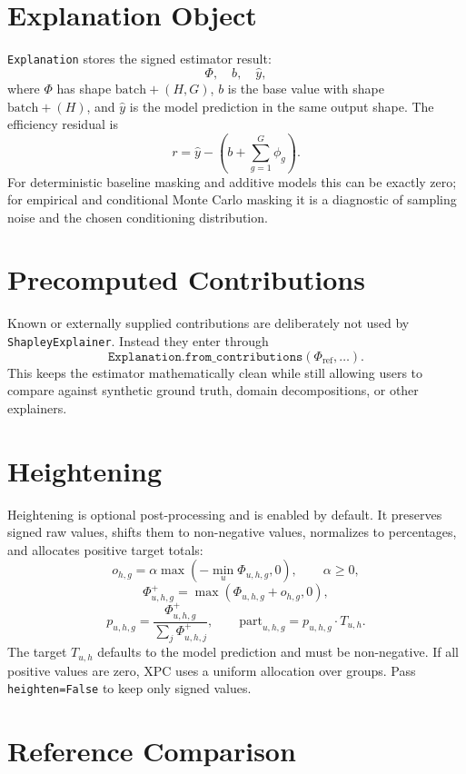 \documentclass[11pt]{article}
\newcommand{\code}[1]{\texttt{#1}}
\begin{document}
\section{Explanation Object}

\code{Explanation} stores the signed estimator result:
\[
\Phi,\quad b,\quad \hat{y},
\]
where \(\Phi\) has shape \(\mathrm{batch}+ (H,G)\), \(b\) is the base value
with shape \(\mathrm{batch}+(H)\), and \(\hat{y}\) is the model prediction in
the same output shape.  The efficiency residual is
\[
r = \hat{y} - \left(b + \sum_{g=1}^{G} \phi_g\right).
\]
For deterministic baseline masking and additive models this can be exactly
zero; for empirical and conditional Monte Carlo masking it is a diagnostic of
sampling noise and the chosen conditioning distribution.

\section{Precomputed Contributions}

Known or externally supplied contributions are deliberately not used by
\code{ShapleyExplainer}.  Instead they enter through
\[
\code{Explanation.from\_contributions}(\Phi_{\mathrm{ref}}, \dots).
\]
This keeps the estimator mathematically clean while still allowing users to
compare against synthetic ground truth, domain decompositions, or other
explainers.

\section{Heightening}

Heightening is optional post-processing and is enabled by default.  It preserves
signed raw values, shifts them to non-negative values, normalizes to
percentages, and allocates positive target totals:
\[
o_{h,g}
=
\alpha \max\!\left(-\min_u \Phi_{u,h,g}, 0\right),
\qquad \alpha \ge 0,
\]
\[
\Phi^{+}_{u,h,g}
=
\max\!\left(\Phi_{u,h,g} + o_{h,g}, 0\right),
\]
\[
p_{u,h,g}
=
\frac{\Phi^{+}_{u,h,g}}{\sum_j \Phi^{+}_{u,h,j}},
\qquad
\mathrm{part}_{u,h,g}
=
p_{u,h,g} \cdot T_{u,h}.
\]
The target \(T_{u,h}\) defaults to the model prediction and must be
non-negative.  If all positive values are zero, XPC uses a uniform allocation
over groups.  Pass \code{heighten=False} to keep only signed values.

\section{Reference Comparison}
\end{document}
